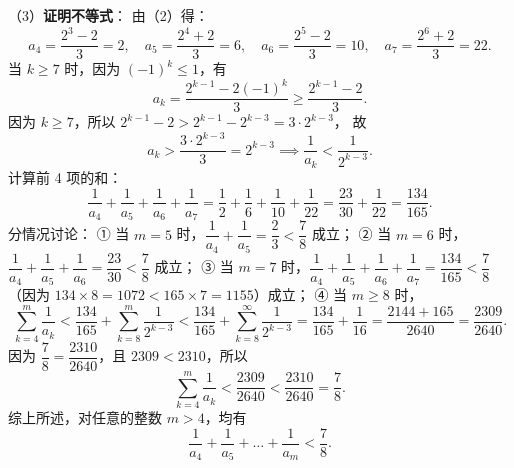 \begin{answer}
（3）\textbf{证明不等式}：
由（2）得：
\nopagebreak[4]
\[
a_4=\frac{2^3-2}{3}=2,\quad a_5=\frac{2^4+2}{3}=6,\quad a_6=\frac{2^5-2}{3}=10,\quad a_7=\frac{2^6+2}{3}=22.
\]
当 $k\geqslant 7$ 时，因为 $(-1)^k\leqslant 1$，有
\nopagebreak[4]
\[
a_k=\frac{2^{k-1}-2(-1)^k}{3}\geqslant \frac{2^{k-1}-2}{3}.
\]
因为 $k\geqslant 7$，所以 $2^{k-1}-2>2^{k-1}-2^{k-3}=3\cdot 2^{k-3}$，
故
\nopagebreak[4]
\[
a_k>\frac{3\cdot 2^{k-3}}{3}=2^{k-3} \implies \frac{1}{a_k}<\frac{1}{2^{k-3}}.
\]
计算前 4 项的和：
\nopagebreak[4]
\[
\frac{1}{a_4}+\frac{1}{a_5}+\frac{1}{a_6}+\frac{1}{a_7}=\frac{1}{2}+\frac{1}{6}+\frac{1}{10}+\frac{1}{22}=\frac{23}{30}+\frac{1}{22}=\frac{134}{165}.
\]
分情况讨论：
① 当 $m=5$ 时，$\dfrac{1}{a_4}+\dfrac{1}{a_5}=\dfrac{2}{3}<\dfrac{7}{8}$ 成立；
② 当 $m=6$ 时，$\dfrac{1}{a_4}+\dfrac{1}{a_5}+\dfrac{1}{a_6}=\dfrac{23}{30}<\dfrac{7}{8}$ 成立；
③ 当 $m=7$ 时，$\dfrac{1}{a_4}+\dfrac{1}{a_5}+\dfrac{1}{a_6}+\dfrac{1}{a_7}=\dfrac{134}{165}<\dfrac{7}{8}$（因为 $134\times 8=1072<165\times 7=1155$）成立；
④ 当 $m\geqslant 8$ 时，
\nopagebreak[4]
\[
\sum_{k=4}^m \frac{1}{a_k} < \frac{134}{165}+\sum_{k=8}^m \frac{1}{2^{k-3}} < \frac{134}{165}+\sum_{k=8}^\infty \frac{1}{2^{k-3}}=\frac{134}{165}+\frac{1}{16}=\frac{2144+165}{2640}=\frac{2309}{2640}.
\]
因为 $\dfrac{7}{8}=\dfrac{2310}{2640}$，且 $2309<2310$，所以
\nopagebreak[4]
\[
\sum_{k=4}^m \frac{1}{a_k}<\frac{2309}{2640}<\frac{2310}{2640}=\frac{7}{8}.
\]
综上所述，对任意的整数 $m>4$，均有
\nopagebreak[4]
\[
\frac{1}{a_4}+\frac{1}{a_5}+\dots+\frac{1}{a_m}<\frac{7}{8}.
\]


\end{answer}